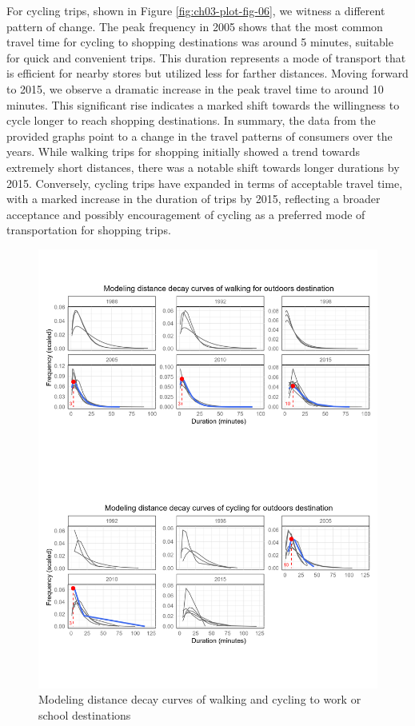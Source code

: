 \documentclass[
11pt, %
oneside, %
english, %
singlespacing, %
]{macthesis} %
\begin{document}
For cycling trips, shown in Figure \ref{fig:ch03-plot-fig-06}, we witness a different pattern of change. The peak frequency in 2005 shows that the most common travel time for cycling to shopping destinations was around 5 minutes, suitable for quick and convenient trips. This duration represents a mode of transport that is efficient for nearby stores but utilized less for farther distances. Moving forward to 2015, we observe a dramatic increase in the peak travel time to around 10 minutes. This significant rise indicates a marked shift towards the willingness to cycle longer to reach shopping destinations.
In summary, the data from the provided graphs point to a change in the travel patterns of consumers over the years. While walking trips for shopping initially showed a trend towards extremely short distances, there was a notable shift towards longer durations by 2015. Conversely, cycling trips have expanded in terms of acceptable travel time, with a marked increase in the duration of trips by 2015, reflecting a broader acceptance and possibly encouragement of cycling as a preferred mode of transportation for shopping trips.

\begin{figure}

{\centering \includegraphics[width=1\linewidth]{figure/ch03_fig_07} 

}

\caption{Modeling distance decay curves of walking and cycling to work or school destinations}\label{fig:ch03-plot-fig-07}
\end{figure}
\end{document}
